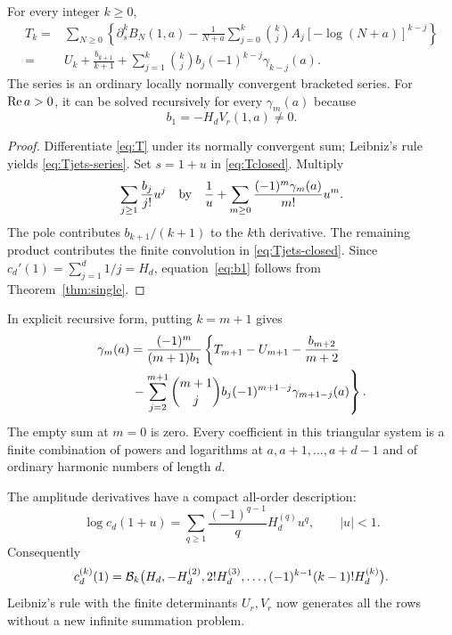 \begin{theorem}\label{thm:jets}
For every integer $k\ge0$,
\begin{align}
 T_k
 ={}&\sum_{N\ge0}\left\{\partial_s^kB_N(1,a)
   -\frac1{N+a}\sum_{j=0}^k\binom kj A_j
                   [-\log(N+a)]^{k-j}\right\}\label{eq:Tjets-series}\\
 ={}&U_k+\frac{b_{k+1}}{k+1}
   +\sum_{j=1}^k\binom kj b_j(-1)^{k-j}\gamma_{k-j}(a).
 \label{eq:Tjets-closed}
\end{align}
The series is an ordinary locally normally convergent bracketed series.
For $\operatorname{Re} a>0$, it can be solved recursively for every $\gamma_m(a)$ because
\begin{equation}\label{eq:b1}
 b_1=-H_dV_r(1,a)\ne0.
\end{equation}
\end{theorem}
\begin{proof}
Differentiate \eqref{eq:T} under its normally convergent sum; Leibniz's
rule yields \eqref{eq:Tjets-series}. Set $s=1+u$ in
\eqref{eq:Tclosed}. Multiply
\[
 \sum_{j\ge1}\frac{b_j}{j!}u^j
 \quad\hbox{by}\quad
 \frac1u+\sum_{m\ge0}\frac{(-1)^m\gamma_m(a)}{m!}u^m.
\]
The pole contributes $b_{k+1}/(k+1)$ to the $k$th derivative. The
remaining product contributes the finite convolution in
\eqref{eq:Tjets-closed}. Since
$c_d'(1)=\sum_{j=1}^d1/j=H_d$, equation~\eqref{eq:b1} follows from
Theorem~\ref{thm:single}.
\end{proof}

In explicit recursive form, putting $k=m+1$ gives
\begin{align}
 \gamma_m(a)=\frac{(-1)^m}{(m+1)b_1}
 \left\{T_{m+1}-U_{m+1}-\frac{b_{m+2}}{m+2}\right.\qquad\notag\\
 \left.{}-\sum_{j=2}^{m+1}\binom{m+1}{j}
       b_j(-1)^{m+1-j}\gamma_{m+1-j}(a)\right\}.
 \label{eq:gamma-invert}
\end{align}
The empty sum at $m=0$ is zero. Every coefficient in this triangular
system is a finite combination of powers and logarithms at $a,a+1,\ldots,a+d-1$
and of ordinary harmonic numbers of length $d$.

The amplitude derivatives have a compact all-order description:
\begin{equation}\label{eq:cd-bell}
 \log c_d(1+u)=\sum_{q\ge1}\frac{(-1)^{q-1}}qH_d^{(q)}u^q,
 \qquad |u|<1.
\end{equation}
Consequently
\[
 c_d^{(k)}(1)=\mathcal B_k\bigl(H_d,-H_d^{(2)},2!H_d^{(3)},\ldots,
                  (-1)^{k-1}(k-1)!H_d^{(k)}\bigr).
\]
Leibniz's rule with the finite determinants $U_r,V_r$ now generates
all the rows without a new infinite summation problem.


